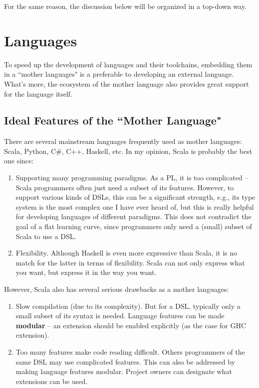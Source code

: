 \documentclass[11pt]{article}
\begin{document}
For the same reason, the discussion below will be organized in a top-down way.

\section{Languages}
To speed up the development of languages and their toolchains, embedding them in a ``mother languages" is a preferable to developing an external language.
What's more, the ecosystem of the mother language also provides great support for the language itself.

\subsection{Ideal Features of the ``Mother Language"}
There are several mainstream languages frequently used as mother languages: Scala, Python, C\#, C++, Haskell, etc.
In my opinion, Scala is probably the best one since:
\begin{enumerate}
    \item Supporting many programming paradigms.
    As a PL, it is too complicated -- Scala programmers often just need a subset of its features.
    However, to support various kinds of DSLs, this can be a significant strength, e.g., its type system is the most complex one I have ever heard of, but this is really helpful for developing languages of different paradigms.
    This does not contradict the goal of a flat learning curve, since programmers only need a (small) subset of Scala to use a DSL.
    \item Flexibility.
    Although Haskell is even more expressive than Scala, it is no match for the latter in terms of flexibility.
    Scala can not only express what you want, but express it in the way you want.
\end{enumerate}

However, Scala also has several serious drawbacks as a mother languages:
\begin{enumerate}
    \item Slow compilation (due to its complexity).
    But for a DSL, typically only a small subset of its syntax is needed.
    Language features can be made \textbf{modular} -- an extension should be enabled explicitly (as the case for GHC extension).
    \item Too many features make code reading difficult.
    Others programmers of the same DSL may use complicated features.
    This can also be addressed by making language features modular.
    Project owners can designate what extensions can be used.
\end{enumerate}
\end{document}
